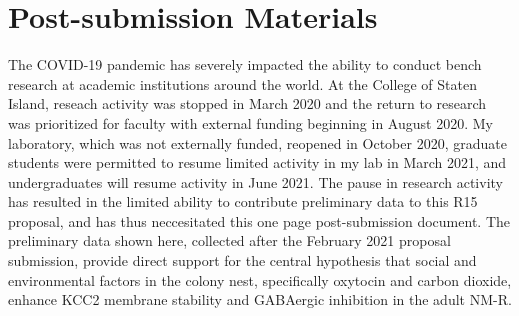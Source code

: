 \documentclass[11pt]{nih}
\def\mydate{2021-06-10 06:45:00 dpm}
\begin{document}
\bigskip

\appendix 


\setcounter{page}{20} %



\section{Post-submission Materials}
\par The COVID-19 pandemic has severely impacted the ability to conduct bench research at academic institutions around the world. At the College of Staten Island,  reseach activity was stopped in March 2020 and the return to research was prioritized for faculty with external funding beginning in August 2020. My laboratory, which was not externally funded, reopened in October 2020, graduate students were permitted to resume limited activity in my lab in March 2021, and undergraduates will resume activity in June 2021. The pause in research activity has resulted in the limited ability to contribute preliminary data to this R15 proposal, and has thus neccesitated this one page post-submission document. The preliminary data shown here, collected after the February 2021 proposal submission, provide direct support for the central hypothesis that social and environmental factors in the colony nest, specifically oxytocin and carbon dioxide, enhance KCC2 membrane stability and GABAergic inhibition in the adult NM-R.
\end{document}
